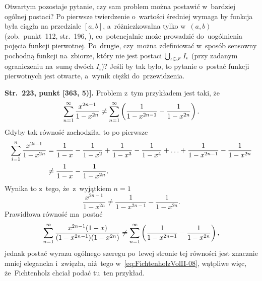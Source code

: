 \documentclass[a4paper,11pt]{article}
\begin{document}
Otwartym pozostaje pytanie, czy sam problem można postawić w~bardziej
ogólnej postaci? Po pierwsze twierdzenie o~wartości średniej wymaga by
funkcja była ciągła na przedziale $[ a, b ]$, a~różniczkowalna tylko
w~$( a, b )$ (zob.~punkt~112, str.~196,
\cite{FichtenholzRachunekRiCTomI2005}), co~potencjalnie może prowadzić
do~uogólnienia pojęcia funkcji pierwotnej. Po~drugie, czy~można
zdefiniować w~sposób sensowny pochodną funkcji na~zbiorze, który nie
jest postaci $\bigcup_{ \iota \in \mathcal{I} } I_{ \iota }$ (przy zadanym
ograniczeniu na~sumę dwóch $I_{ \iota }$)? Jeśli by tak było, to
pytanie o~postać funkcji pierwotnych jest otwarte, a~wynik ciężki
do~przewidzenia.

\vspace{\spaceFour}





\start \textbf{Str.~223, punkt [363, 5)].} Problem z~tym przykładem
jest taki, że
\begin{equation}
  \label{eq:FichtenholzVolII-08}
  \sum\limits_{ n = 1 }^{ \infty } \frac{ x^{ 2n - 1 } }{ 1 - x^{ 2n } }
  \neq \sum\limits_{ n = 1 }^{ \infty } \left( \frac{ 1 }{ 1 - x^{ 2n - 1 } }
    - \frac{ 1 }{ 1 - x^{ 2n } } \right).
\end{equation}
Gdyby tak równość zachodziła, to po pierwsze
\begin{equation}
  \label{eq:FichtenholzVolII-09}
  \begin{split}
    \sum\limits_{ i = 1 }^{ n } \frac{ x^{ 2i - 1 } }{ 1 - x^{ 2n } } &=
    \frac{ 1 }{ 1 - x } - \frac{ 1 }{ 1 - x^{ 2 } } + \frac{ 1 }{ 1 -
      x^{ 3 } } - \frac{ 1 }{ 1 - x^{ 4 } }
    + \ldots + \frac{ 1 }{ 1 - x^{ 2n - 1 } } - \frac{ 1 }{ 1 - x^{ 2n } } \\
    &\neq \frac{ 1 }{ 1 - x } - \frac{ 1 }{ 1 - x^{ 2n } }.
  \end{split}
\end{equation}
Wynika to z~tego, że~z~wyjątkiem $n = 1$
\begin{equation}
  \label{eq:FichtenholzVolII-10}
  \frac{ x^{ 2n - 1 } }{ 1 - x^{ 2n } }
  \neq \frac{ 1 }{ 1 - x^{ 2n - 1 } } - \frac{ 1 }{ 1 - x^{ 2n } }.
\end{equation}
Prawidłowa równość ma~postać
\begin{equation}
  \label{eq:FichtenholzVolII-11}
  \sum\limits_{ n = 1 }^{ \infty } \frac{ x^{ 2n - 1 } ( 1 - x ) }{ ( 1 - x^{ 2n - 1 } )
    ( 1 - x^{ 2n } ) }
  \neq \sum\limits_{ n = 1 }^{ \infty } \left( \frac{ 1 }{ 1 - x^{ 2n - 1 } }
    - \frac{ 1 }{ 1 - x^{ 2n } } \right),
\end{equation}
jednak postać wyrazu ogólnego szeregu po~lewej stronie tej równości
jest znacznie mniej elegancka i~zwięzła, niż~tego
w~\eqref{eq:FichtenholzVolII-08}, wątpliwe więc, że~Fichtenholz chciał
podać tu~ten przykład.
\end{document}
